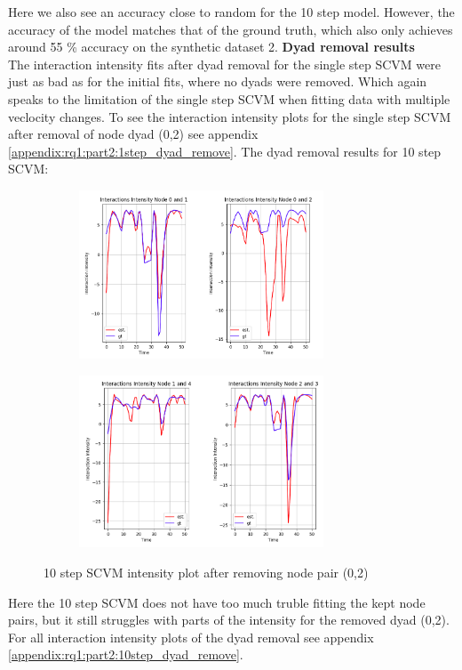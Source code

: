 \noindent
Here we also see an accuracy close to random for the 10 step model. However, the accuracy of the model matches that of the ground truth, which also only achieves around 55 \% accuracy on the synthetic dataset 2.
\clearpage
\noindent
\textbf{Dyad removal results}
\\
The interaction intensity fits after dyad removal for the single step SCVM were just as bad as for the initial fits, where no dyads were removed. Which again speaks to the limitation of the single step SCVM when fitting data with multiple veclocity changes. 
To see the interaction intensity plots for the single step SCVM after removal of node dyad (0,2) see appendix \ref{appendix:rq1:part2:1step_dyad_remove}.
\clearpage
\noindent
The dyad removal results for 10 step SCVM:
\begin{figure}[H]
    \centering
    \begin{subfigure}[b]{\textwidth}
        \centering
        \includegraphics[width=0.8\textwidth]{0_images/10step_SCVM_dyad_removal_plot1.png}
    \end{subfigure}
    \hfill
    \begin{subfigure}[b]{\textwidth}
        \centering
        \includegraphics[width=0.8\textwidth]{0_images/10step_SCVM_dyad_removal_plot2.png}
    \end{subfigure}
        \caption{10 step SCVM intensity plot after removing node pair (0,2)}
    \label{fig:RQ1:SCVM_accuracy}
\end{figure}
\noindent
Here the 10 step SCVM does not have too much truble fitting the kept node pairs, but it still struggles with parts of the intensity for the removed dyad (0,2). For all interaction intensity plots of the dyad removal see appendix \ref{appendix:rq1:part2:10step_dyad_remove}.



